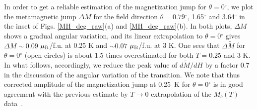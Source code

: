 \documentclass[twocolumn, aps, superscriptaddress, amsfonts,floatfix]{revtex4}%
\begin{document}
{In order to get a reliable estimation of the magnetization jump for $\theta=0$$^\circ$, we plot 
the metamagnetic jump $\Delta M$ for the field direction $\theta = 0.79$$^\circ$, 1.65$^\circ$ and 3.64$^\circ$ in the inset of Figs. \ref{MH_deg_raw}(a) and \ref{MH_deg_raw}(b). 
In both plots, $\Delta M$ shows a gradual angular variation, and its linear extrapolation to $\theta=0$$^\circ$ gives 
$\Delta M\sim 0.09$ $\mu_{\rm B}$/f.u. at 0.25 K and $\sim0.07$ $\mu_{\rm B}$/f.u. at 3 K.
One sees that $\Delta \tilde{M}$ for $\theta = 0$$^\circ$ (open circles) is about 1.5 times overestimated for both $T=0.25$  and 3 K. 
In what follows, accordingly, we reduce the peak value of $d\tilde{M}/dH$ by a factor 0.7 in the discussion of the angular variation of the transition. 
We note that thus corrected amplitude of the magnetization jump at 0.25~K for $\theta=0$$^\circ$ is in good agreement with the previous estimate by $T\rightarrow 0$ extrapolation of the $M_b(T)$ data~\cite{hardy2011transverse}.




}
\end{document}
